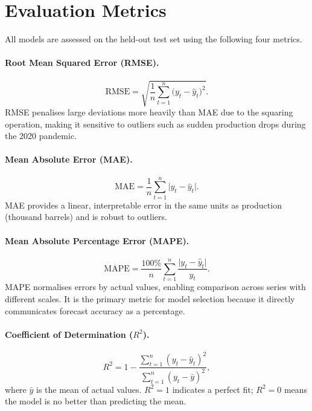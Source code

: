 \documentclass[12pt,a4paper]{article}
\begin{document}
\section{Evaluation Metrics}

All models are assessed on the held-out test set using the following four metrics.

\paragraph{Root Mean Squared Error (RMSE).}
\begin{equation}
  \mathrm{RMSE} = \sqrt{\frac{1}{n}\sum_{t=1}^{n}\bigl(y_t - \hat{y}_t\bigr)^2}.
  \label{eq:rmse}
\end{equation}
RMSE penalises large deviations more heavily than MAE due to the squaring operation, making it sensitive to outliers such as sudden production drops during the 2020 pandemic.

\paragraph{Mean Absolute Error (MAE).}
\begin{equation}
  \mathrm{MAE} = \frac{1}{n}\sum_{t=1}^{n}\bigl|y_t - \hat{y}_t\bigr|.
  \label{eq:mae}
\end{equation}
MAE provides a linear, interpretable error in the same units as production (thousand barrels) and is robust to outliers.

\paragraph{Mean Absolute Percentage Error (MAPE).}
\begin{equation}
  \mathrm{MAPE} = \frac{100\%}{n}\sum_{t=1}^{n}\frac{\bigl|y_t - \hat{y}_t\bigr|}{y_t}.
  \label{eq:mape}
\end{equation}
MAPE normalises errors by actual values, enabling comparison across series with different scales. It is the primary metric for model selection because it directly communicates forecast accuracy as a percentage.

\paragraph{Coefficient of Determination ($R^2$).}
\begin{equation}
  R^2 = 1 - \frac{\sum_{t=1}^{n}(y_t - \hat{y}_t)^2}{\sum_{t=1}^{n}(y_t - \bar{y})^2},
  \label{eq:r2}
\end{equation}
where $\bar{y}$ is the mean of actual values. $R^2 = 1$ indicates a perfect fit; $R^2 = 0$ means the model is no better than predicting the mean.
\end{document}
